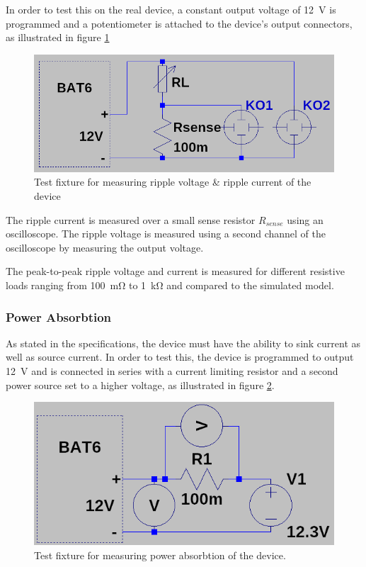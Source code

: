 In  order  to  test this on the  real  device,  a  constant  output  voltage  of
\SI{12}{\volt} is programmed and a potentiometer  is  attached  to  the device's
output connectors, as illustrated in figure \ref{fig:verification:ripple_fix}

\begin{figure}[th!]
    \centering
    \includegraphics[width=.6\textwidth]{images/sim/ripple-fixture.png}
    \caption{Test fixture for measuring ripple voltage \& ripple current of the device}
    \label{fig:verification:ripple_fix}
\end{figure}

The ripple current  is measured over a small sense resistor $R_{sense}$ using an
oscilloscope. The ripple voltage  is  measured  using  a  second  channel of the
oscilloscope by measuring the output voltage.

The peak-to-peak ripple voltage  and current is measured for different resistive
loads ranging from \SI{100}{\milli\ohm} to \SI{1}{\kilo\ohm} and compared to the
simulated model.


\subsubsection{Power Absorbtion}

As stated in the specifications,  the  device  must  have  the  ability  to sink
current  as  well  as  source  current.  In  order to test this, the  device  is
programmed  to  output  \SI{12}{\volt} and is connected in series with a current
limiting resistor  and  a  second  power  source  set  to  a  higher voltage, as
illustrated      in      figure     \ref{fig:verification:power_absorbtion_fix}.

\begin{figure}[th!]
    \centering
    \includegraphics[width=.6\textwidth]{images/sim/power-absorbtion-fixture.png}
    \caption{Test fixture for measuring power absorbtion of the device.}
    \label{fig:verification:power_absorbtion_fix}
\end{figure}

